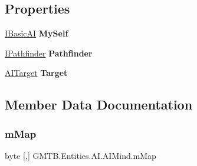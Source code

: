\subsection*{Properties}
\begin{DoxyCompactItemize}
\item 
\mbox{\label{class_g_m_t_b_1_1_entities_1_1_a_i_1_1_a_i_mind_a85a1d43385a713f858e76ab148dfe0b6}} 
\mbox{\hyperlink{interface_g_m_t_b_1_1_interfaces_1_1_i_basic_a_i}{I\+Basic\+AI}} {\bfseries My\+Self}
\item 
\mbox{\label{class_g_m_t_b_1_1_entities_1_1_a_i_1_1_a_i_mind_aa3485643ff865c0f8d40df34ab1c2e07}} 
\mbox{\hyperlink{interface_g_m_t_b_1_1_interfaces_1_1_i_pathfinder}{I\+Pathfinder}} {\bfseries Pathfinder}
\item 
\mbox{\label{class_g_m_t_b_1_1_entities_1_1_a_i_1_1_a_i_mind_a8af6d88c8e47c4f4bff34a33f6ab34ce}} 
\mbox{\hyperlink{interface_g_m_t_b_1_1_interfaces_1_1_a_i_target}{A\+I\+Target}} {\bfseries Target}
\end{DoxyCompactItemize}


\subsection{Member Data Documentation}
\mbox{\label{class_g_m_t_b_1_1_entities_1_1_a_i_1_1_a_i_mind_a9bb21fe5d8a11ed1cc818f23dbdc9071}} 
\subsubsection{\texorpdfstring{mMap}{mMap}}
{\footnotesize\ttfamily byte \mbox{[},\mbox{]} G\+M\+T\+B.\+Entities.\+A\+I.\+A\+I\+Mind.\+m\+Map\hspace{0.3cm}{\ttfamily [protected]}}

